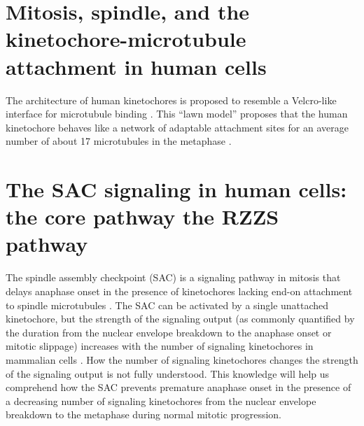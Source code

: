 \section{Mitosis, spindle, and the kinetochore-microtubule attachment in human cells}

The architecture of human kinetochores is proposed to resemble a Velcro-like interface for microtubule binding \cite{Velcro}. This ``lawn model'' proposes that the human kinetochore behaves like a network of adaptable attachment sites for an average number of about 17 microtubules in the metaphase \cite{Wendell1993, Zaytsev2014, Zaytsev2015, Kukreja2020}.





\section{The SAC signaling in human cells: the core pathway  the RZZS pathway}


The spindle assembly checkpoint (SAC) is a signaling pathway in mitosis that delays anaphase onset in the presence of kinetochores lacking end-on attachment to spindle microtubules \cite{LateralAttachmentSAC}. The SAC can be activated by a single unattached kinetochore, but the strength of the signaling output (as commonly quantified by the duration from the nuclear envelope breakdown to the anaphase onset or mitotic slippage) increases with the number of signaling kinetochores in mammalian cells \cite{RiederNormalProgression,Rheostat,Ablation}. How the number of signaling kinetochores changes the strength of the signaling output is not fully understood. This knowledge will help us comprehend how the SAC prevents premature anaphase onset in the presence of a decreasing number of signaling kinetochores from the nuclear envelope breakdown to the metaphase during normal mitotic progression.

